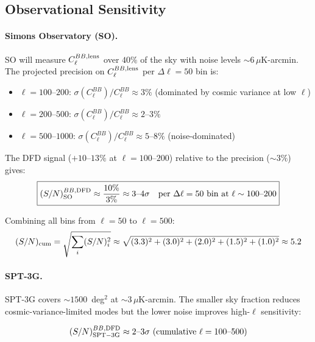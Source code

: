 \documentclass[11pt,a4paper]{article}
\begin{document}
\subsection{Observational Sensitivity}

\paragraph{Simons Observatory (SO).}
SO will measure $C_\ell^{BB,\rm lens}$ over $40\%$ of the sky with
noise levels $\sim 6\,\mu$K-arcmin.  The projected precision on
$C_\ell^{BB,\rm lens}$ per $\Delta\ell = 50$ bin is:

\begin{itemize}
\item $\ell = 100$--$200$: $\sigma(C_\ell^{BB})/C_\ell^{BB} \approx 3\%$
  (dominated by cosmic variance at low $\ell$)
\item $\ell = 200$--$500$: $\sigma(C_\ell^{BB})/C_\ell^{BB} \approx 2$--$3\%$
\item $\ell = 500$--$1000$: $\sigma(C_\ell^{BB})/C_\ell^{BB} \approx 5$--$8\%$
  (noise-dominated)
\end{itemize}

The DFD signal ($+10$--$13\%$ at $\ell = 100$--$200$) relative to the
precision ($\sim 3\%$) gives:
\begin{equation}
\boxed{
(S/N)_{\rm SO}^{BB,\rm DFD} \approx \frac{10\%}{3\%} \approx 3\text{--}4\sigma
\quad\text{per }\Delta\ell = 50\text{ bin at }\ell \sim 100\text{--}200
}
\end{equation}

Combining all bins from $\ell = 50$ to $\ell = 500$:
\begin{equation}
(S/N)_{\rm cum} = \sqrt{\sum_i (S/N)_i^2}
\approx \sqrt{(3.3)^2 + (3.0)^2 + (2.0)^2 + (1.5)^2 + (1.0)^2}
\approx 5.2
\end{equation}

\paragraph{SPT-3G.}
SPT-3G covers $\sim 1500$~deg$^2$ at $\sim 3\,\mu$K-arcmin.  The
smaller sky fraction reduces cosmic-variance-limited modes but the
lower noise improves high-$\ell$ sensitivity:

\begin{equation}
(S/N)_{\rm SPT-3G}^{BB,\rm DFD} \approx 2\text{--}3\sigma
\text{ (cumulative } \ell = 100\text{--}500\text{)}
\end{equation}
\end{document}
